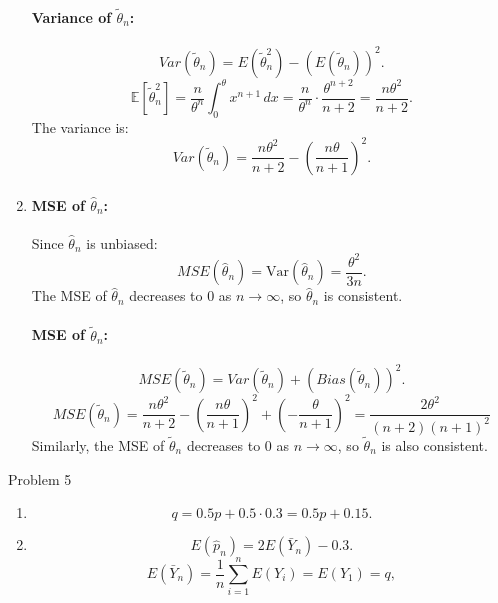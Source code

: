 \documentclass[12pt,letterpaper, onecolumn]{exam}
\begin{document}
\begin{questions}
\begin{solution}
\begin{enumerate}
            \paragraph{         Variance of \(\tilde{\theta}_n\):}
            \[
            Var(\tilde{\theta}_n) = E(\tilde{\theta}_n^2) - (E(\tilde{\theta}_n))^2.
            \]
            \[
            \mathbb{E}[\tilde{\theta}_n^2] = \frac{n}{\theta^n} \int_0^\theta x^{n+1} \, dx = \frac{n}{\theta^n} \cdot \frac{\theta^{n+2}}{n+2} = \frac{n \theta^2}{n+2}.
            \]
                    The variance is:
            \[
            Var(\tilde{\theta}_n) = \frac{n \theta^2}{n+2} - \left(\frac{n \theta}{n+1}\right)^2.
            \]
        \item\paragraph{MSE of \(\hat{\theta}_n\):}
            Since \(\hat{\theta}_n\) is unbiased:
            \[
           MSE(\hat{\theta}_n) = \mathrm{Var}(\hat{\theta}_n) = \frac{\theta^2}{3n}.
            \]
            The MSE of \(\hat{\theta}_n\) decreases to 0 as \(n \to \infty\), so \(\hat{\theta}_n\) is consistent.
        \paragraph{ MSE of \(\tilde{\theta}_n\):}
            \[
            MSE(\tilde{\theta}_n) = Var(\tilde{\theta}_n) + (Bias(\tilde{\theta}_n))^2.
            \]
            \[
            MSE(\tilde{\theta}_n) = \frac{n \theta^2}{n+2} - \left(\frac{n \theta}{n+1}\right)^2 + \left(-\frac{\theta}{n+1}\right)^2 = \frac{2\theta^2}{(n+2)(n+1)^2}
            \]
            Similarly, the MSE of \(\tilde{\theta}_n\) decreases to 0 as \(n \to \infty\), so \(\tilde{\theta}_n\) is also consistent.
     \end{enumerate}
        
 \end{solution}
 
 \question Problem 5
 \begin{solution}
     \begin{enumerate}
     \item \[
        q = 0.5p + 0.5 \cdot 0.3 = 0.5p + 0.15.
        \]
     \item \[
        E(\hat{p}_n) = 2 E(\bar{Y}_n)- 0.3.
        \]
        \[
        E(\bar{Y}_n) = \frac{1}{n} \sum_{i=1}^n E(Y_i) = E(Y_1) = q,
        \]


\end{enumerate}
\end{solution}
\end{questions}
\end{document}
